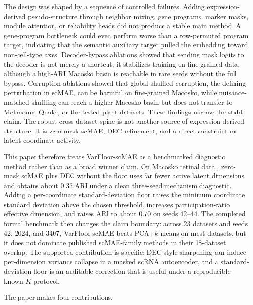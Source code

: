 \documentclass[11pt]{article}
\begin{document}
The design was shaped by a sequence of controlled failures. Adding expression-derived pseudo-structure through neighbor mixing, gene programs, marker masks, module attention, or reliability heads did not produce a stable main method. A gene-program bottleneck could even perform worse than a row-permuted program target, indicating that the semantic auxiliary target pulled the embedding toward non-cell-type axes. Decoder-bypass ablations showed that sending mask logits to the decoder is not merely a shortcut; it stabilizes training on fine-grained data, although a high-ARI Macosko basin is reachable in rare seeds without the full bypass. Corruption ablations showed that global shuffled corruption, the defining perturbation in scMAE, can be harmful on fine-grained Macosko, while nuisance-matched shuffling can reach a higher Macosko basin but does not transfer to Melanoma, Quake, or the tested plant datasets. These findings narrow the stable claim. The robust cross-dataset spine is not another source of expression-derived structure. It is zero-mask scMAE, DEC refinement, and a direct constraint on latent coordinate activity.

This paper therefore treats VarFloor-scMAE as a benchmarked diagnostic method rather than as a broad winner claim. On Macosko retinal data \citep{macosko2015dropseq}, zero-mask scMAE plus DEC without the floor uses far fewer active latent dimensions and obtains about $0.33$ ARI under a clean three-seed mechanism diagnostic. Adding a per-coordinate standard-deviation floor raises the minimum coordinate standard deviation above the chosen threshold, increases participation-ratio effective dimension, and raises ARI to about $0.70$ on seeds 42--44. The completed formal benchmark then changes the claim boundary: across 23 datasets and seeds 42, 2024, and 3407, VarFloor-scMAE beats PCA+$k$-means on most datasets, but it does not dominate published scMAE-family methods in their 18-dataset overlap. The supported contribution is specific: DEC-style sharpening can induce per-dimension variance collapse in a masked scRNA autoencoder, and a standard-deviation floor is an auditable correction that is useful under a reproducible known-$K$ protocol.

The paper makes four contributions.
\end{document}
